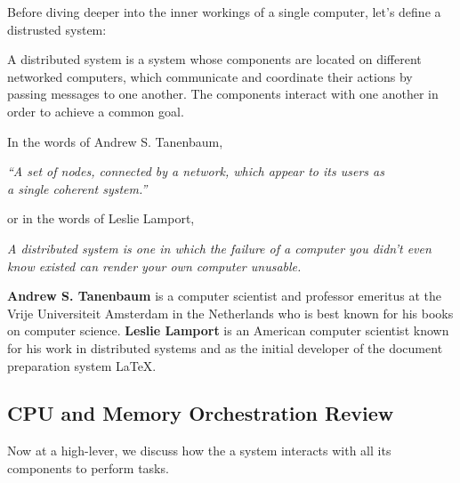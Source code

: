 \newpage 

\noindent 
Before diving deeper into the inner workings of a single computer, let's define a distrusted system:

\begin{Def}
    
    A distributed system is a system whose components are located on different networked computers, which communicate and coordinate their actions by passing messages to one another. 
    The components interact with one another in order to achieve a common goal.
\end{Def}

\noindent
In the words of Andrew S. Tanenbaum,

\begin{gbox}

\begin{center}
    \textit{``A set of nodes, connected by a
    network, which appear to its users as
    \\a single coherent system.''}\\
\end{center}

\vspace{.5em}
\end{gbox}
\noindent
or in the words of Leslie Lamport,

\begin{gbox}
\begin{center}
    \textit{A distributed system is one in which
    the failure of a computer you didn't
    even know existed can render your
    own computer unusable.}
\end{center}

\vspace{.5em}
\end{gbox}

\begin{Tip}
    \textbf{Andrew S. Tanenbaum} is a computer scientist and professor emeritus at the Vrije Universiteit Amsterdam in the Netherlands who is best known for his books on computer science.
    \textbf{Leslie Lamport} is an American computer scientist known for his work in distributed systems and as the initial developer of the document preparation system \LaTeX.
\end{Tip}

\subsection{CPU and Memory Orchestration Review}
Now at a high-lever, we discuss how the a system interacts with all its components to perform tasks.

